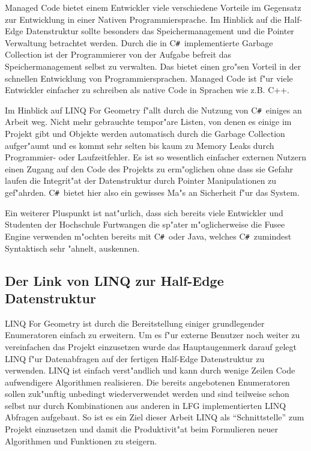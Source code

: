 \documentclass[pagesize, paper=a4, fontsize=12pt,titlepage=true, headings=small, headnosepline, abstractoff, liststotoc, nochapterprefix, plainheadsepline]{scrreprt}
\newcommand{\CSS}{C\texttt{\# }}
\newcommand{\LFGS}{LINQ For Geometry }
\newcommand{\HES}{Half-Edge Datenstruktur }
\begin{document}
		Managed Code bietet einem Entwickler viele verschiedene Vorteile im Gegensatz zur Entwicklung in einer Nativen Programmiersprache. Im Hinblick auf die \HES sollte besonders das Speichermanagement und die Pointer Verwaltung betrachtet werden. Durch die in \CSS implementierte Garbage Collection ist der Programmierer von der Aufgabe befreit das Speichermanagement selbst zu verwalten. Das bietet einen gro"sen Vorteil in der schnellen Entwicklung von Programmiersprachen. Managed Code ist f"ur viele Entwickler einfacher zu schreiben als native Code in Sprachen wie z.B. C++.

Im Hinblick auf \LFGS f"allt durch die Nutzung von \CSS einiges an Arbeit weg. Nicht mehr gebrauchte tempor"are Listen, von denen es einige im Projekt gibt und Objekte werden automatisch durch die Garbage Collection aufger"aumt und es kommt sehr selten bis kaum zu Memory Leaks durch Programmier- oder Laufzeitfehler. Es ist so wesentlich einfacher externen Nutzern einen Zugang auf den Code des Projekts zu erm"oglichen ohne dass sie Gefahr laufen die Integrit"at der Datenstruktur durch Pointer Manipulationen zu gef"ahrden. \CSS bietet hier also ein gewisses Ma"s an Sicherheit f"ur das System.

Ein weiterer Pluspunkt ist nat"urlich, dass sich bereits viele Entwickler und Studenten der Hochschule Furtwangen die sp"ater m"oglicherweise die Fusee Engine verwenden m"ochten bereits mit \CSS oder Java, welches \CSS zumindest Syntaktisch sehr "ahnelt, auskennen.
\subsection {Der Link von LINQ zur \HES}
				\LFGS ist durch die Bereitstellung einiger grundlegender Enumeratoren einfach zu erweitern. Um es f"ur externe Benutzer noch weiter zu vereinfachen das Projekt einzusetzen wurde das Hauptaugenmerk darauf gelegt LINQ f"ur Datenabfragen auf der fertigen \HES zu verwenden. LINQ ist einfach verst"andlich und kann durch wenige Zeilen Code aufwendigere Algorithmen realisieren. Die bereits angebotenen Enumeratoren sollen zuk"unftig unbedingt wiederverwendet werden und sind teilweise schon selbst nur durch Kombinationen aus anderen in LFG implementierten LINQ Abfragen aufgebaut. So ist es ein Ziel dieser Arbeit LINQ als "`Schnittstelle"' zum Projekt einzusetzen und damit die Produktivit"at beim Formulieren neuer Algorithmen und Funktionen zu steigern.
\end{document}
